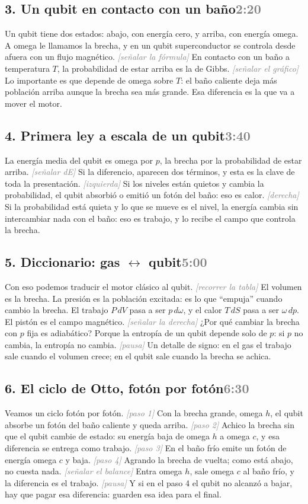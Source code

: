\documentclass[11pt,a4paper]{article}
\newcommand{\acc}[1]{\textcolor{gray}{\textit{[#1]}}}
\newcommand{\slide}[2]{\subsection{#1\hfill\normalfont\small\textcolor{gray}{#2}}}
\begin{document}
\slide{3. Un qubit en contacto con un baño}{2:20}
Un qubit tiene dos estados: abajo, con energía cero, y arriba, con energía omega. A omega le llamamos la brecha, y en un qubit superconductor se controla desde afuera con un flujo magnético. \acc{señalar la fórmula} En contacto con un baño a temperatura $T$, la probabilidad de estar arriba es la de Gibbs. \acc{señalar el gráfico} Lo importante es que depende de omega sobre $T$: el baño caliente deja más población arriba aunque la brecha sea más grande. Esa diferencia es la que va a mover el motor.

\slide{4. Primera ley a escala de un qubit}{3:40}
La energía media del qubit es omega por $p$, la brecha por la probabilidad de estar arriba. \acc{señalar dE} Si la diferencio, aparecen dos términos, y esta es la clave de toda la presentación. \acc{izquierda} Si los niveles están quietos y cambia la probabilidad, el qubit absorbió o emitió un fotón del baño: eso es calor. \acc{derecha} Si la probabilidad está quieta y lo que se mueve es el nivel, la energía cambia sin intercambiar nada con el baño: eso es trabajo, y lo recibe el campo que controla la brecha.

\slide{5. Diccionario: gas $\leftrightarrow$ qubit}{5:00}
Con eso podemos traducir el motor clásico al qubit. \acc{recorrer la tabla} El volumen es la brecha. La presión es la población excitada: es lo que ``empuja'' cuando cambio la brecha. El trabajo $P\,dV$ pasa a ser $p\,d\omega$, y el calor $T\,dS$ pasa a ser $\omega\,dp$. El pistón es el campo magnético. \acc{señalar la derecha} ¿Por qué cambiar la brecha con $p$ fija es adiabático? Porque la entropía de un qubit depende solo de $p$: si $p$ no cambia, la entropía no cambia. \acc{pausa} Un detalle de signo: en el gas el trabajo sale cuando el volumen crece; en el qubit sale cuando la brecha se achica.

\slide{6. El ciclo de Otto, fotón por fotón}{6:30}
Veamos un ciclo fotón por fotón. \acc{paso 1} Con la brecha grande, omega $h$, el qubit absorbe un fotón del baño caliente y queda arriba. \acc{paso 2} Achico la brecha sin que el qubit cambie de estado: su energía baja de omega $h$ a omega $c$, y esa diferencia se entrega como trabajo. \acc{paso 3} En el baño frío emite un fotón de energía omega $c$ y baja. \acc{paso 4} Agrando la brecha de vuelta; como está abajo, no cuesta nada. \acc{señalar el balance} Entra omega $h$, sale omega $c$ al baño frío, y la diferencia es el trabajo. \acc{pausa} Y si en el paso 4 el qubit no alcanzó a bajar, hay que pagar esa diferencia: guarden esa idea para el final.
\end{document}
